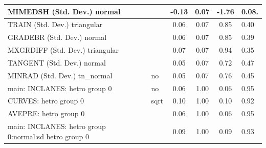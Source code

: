 \begin{table}
\begin{center}
\begin{tabular}{|l|l|c|c|c|l|}
			\hline
			MIMEDSH (Std. Dev.) normal &  & -0.13 & 0.07 & -1.76 & 0.08. \\
			\hline
			TRAIN (Std. Dev.) triangular &  & 0.06 & 0.07 & 0.85 & 0.40 \\
			\hline
			GRADEBR (Std. Dev.) normal &  & 0.06 & 0.07 & 0.85 & 0.39 \\
			\hline
			MXGRDIFF (Std. Dev.) triangular &  & 0.07 & 0.07 & 0.94 & 0.35 \\
			\hline
			TANGENT (Std. Dev.) normal &  & 0.05 & 0.07 & 0.72 & 0.47 \\
			\hline
			MINRAD (Std. Dev.) tn_normal & no & 0.05 & 0.07 & 0.76 & 0.45 \\
			\hline
			main: INCLANES: hetro group 0 & no & 0.06 & 1.00 & 0.06 & 0.95 \\
			\hline
			CURVES: hetro group 0 & sqrt & 0.10 & 1.00 & 0.10 & 0.92 \\
			\hline
			AVEPRE: hetro group 0 &  & 0.06 & 1.00 & 0.06 & 0.95 \\
			\hline
			main: INCLANES: hetro group 0:normal:sd  hetro group 0 &  & 0.09 & 1.00 & 0.09 & 0.93 \\
			\hline
		\end{tabular}
	\end{center}
\end{table}